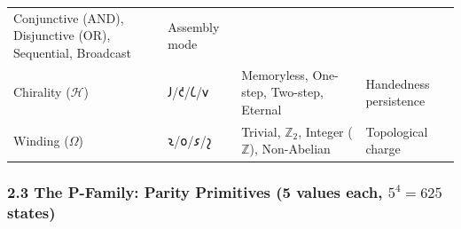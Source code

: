 \documentclass[12pt,a4paper]{article}
\begin{document}
\begin{longtable}[]{@{}llll@{}}
\begin{minipage}[t]{0.22\columnwidth}
Conjunctive (AND), Disjunctive (OR), Sequential, Broadcast\strut
\end{minipage} & \begin{minipage}[t]{0.17\columnwidth}\raggedright
Assembly mode\strut
\end{minipage}\tabularnewline
\begin{minipage}[t]{0.30\columnwidth}\raggedright
Chirality (\(\mathcal{H}\))\strut
\end{minipage} & \begin{minipage}[t]{0.19\columnwidth}\raggedright
𐑓/𐑒/𐑖/𐑫\strut
\end{minipage} & \begin{minipage}[t]{0.22\columnwidth}\raggedright
Memoryless, One-step, Two-step, Eternal\strut
\end{minipage} & \begin{minipage}[t]{0.17\columnwidth}\raggedright
Handedness persistence\strut
\end{minipage}\tabularnewline
\begin{minipage}[t]{0.30\columnwidth}\raggedright
Winding (\(\Omega\))\strut
\end{minipage} & \begin{minipage}[t]{0.19\columnwidth}\raggedright
𐑷/𐑴/𐑭/𐑟\strut
\end{minipage} & \begin{minipage}[t]{0.22\columnwidth}\raggedright
Trivial, \(\mathbb{Z}_2\), Integer (\(\mathbb{Z}\)), Non-Abelian\strut
\end{minipage} & \begin{minipage}[t]{0.17\columnwidth}\raggedright
Topological charge\strut
\end{minipage}\tabularnewline
\bottomrule
\end{longtable}

\hypertarget{the-p-family-parity-primitives-5-values-each-54-625-states}{%
\subsubsection{\texorpdfstring{2.3 The P-Family: Parity Primitives (5
values each, \(5^4 = 625\)
states)}{2.3 The P-Family: Parity Primitives (5 values each, 5\^{}4 = 625 states)}}\label{the-p-family-parity-primitives-5-values-each-54-625-states}}
\end{document}
